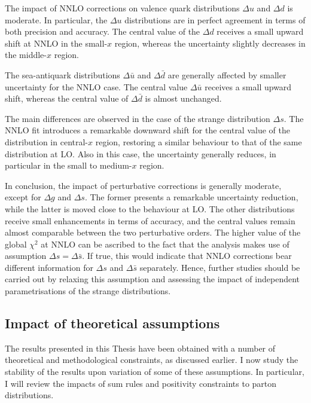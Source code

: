 The impact of NNLO corrections on valence quark distributions $\Delta u$ and $\Delta d$ is moderate. In particular, the $\Delta u$ distributions are in perfect agreement in terms of both precision and accuracy. The central value of the $\Delta d$ receives a small upward shift at NNLO in the small-$x$ region, whereas the uncertainty slightly decreases in the middle-$x$ region.%

The sea-antiquark distributions $\Delta \bar{u}$ and $\Delta \bar{d}$ are generally affected by smaller uncertainty for the NNLO case. The central value $\Delta \bar{u}$ receives a small upward shift, whereas the central value of $\Delta \bar{d}$ is almost unchanged.%

The main differences are observed in the case of the strange distribution $\Delta s$. The NNLO fit introduces a remarkable downward shift for the central value of the distribution in central-$x$ region, restoring a similar behaviour to that of the same distribution at LO. Also in this case, the uncertainty generally reduces, in particular in the small to medium-$x$ region.%

In conclusion, the impact of perturbative corrections is generally moderate, except for $\Delta g$ and $\Delta s$. The former presents a remarkable uncertainty reduction, while the latter is moved close to the behaviour at LO. The other distributions receive small enhancements in terms of accuracy, and the central values remain almost comparable between the two perturbative orders. The higher value of the global $\chi^2$ at NNLO can be ascribed to the fact that the analysis makes use of assumption $\Delta s = \Delta \bar{s}$. If true, this would indicate that NNLO corrections bear different information for $\Delta s$ and $\Delta \bar{s}$ separately. Hence, further studies should be carried out by relaxing this assumption and assessing the impact of independent parametrisations of the strange distributions.

\subsection{Impact of theoretical assumptions}
The results presented in this Thesis have been obtained with a number of theoretical and methodological constraints, as discussed earlier. I now study the stability of the results upon variation of some of these assumptions. In particular, I will review the impacts of sum rules and positivity constraints to parton distributions. 

